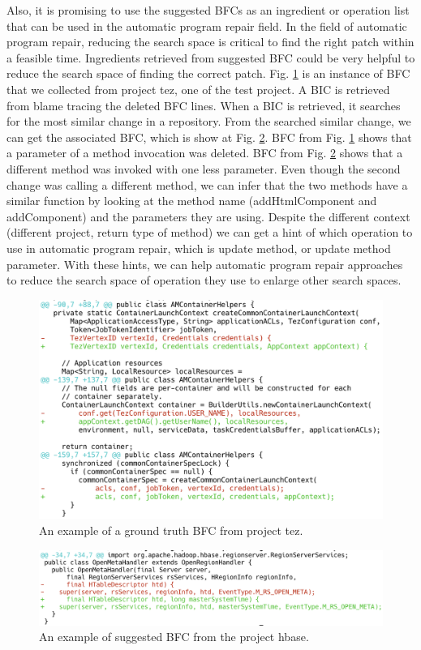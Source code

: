 Also, it is promising to use the suggested BFCs as an ingredient or operation list that can be used in the automatic program repair field.
In the field of automatic program repair, reducing the search space is critical to find the right patch within a feasible time.
Ingredients retrieved from suggested BFC could be very helpful to reduce the search space of finding the correct patch.
Fig. \ref{fig:ps_1} is an instance of BFC that we collected from project tez, one of the test project. 
A BIC is retrieved from blame tracing the deleted BFC lines.
When a BIC is retrieved, it searches for the most similar change in a repository.
From the searched similar change, we can get the associated BFC, which is show at Fig. \ref{fig:ps_2}.
BFC from Fig. \ref{fig:ps_1} shows that a parameter of a method invocation was deleted.
BFC from Fig. \ref{fig:ps_2} shows that a different method was invoked with one less parameter.
Even though the second change was calling a different method, we can infer that the two methods have a similar function by looking at the method name (addHtmlComponent and addComponent) and the parameters they are using.
Despite the different context (different project, return type of method) we can get a hint of which operation to use in automatic program repair, which is update method, or update method parameter.
With these hints, we can help automatic program repair approaches to reduce the search space of operation they use to enlarge other search spaces.


\begin{figure}[!tbp]
\renewcommand{\arraystretch}{1}
    \centering
    \includegraphics[width=\linewidth]{figures/ps1.png}\hfill
    \caption{An example of a ground truth BFC from project tez.}
    \label{fig:ps_1}
\end{figure}

\begin{figure}[!tbp]
\renewcommand{\arraystretch}{1}
    \centering
    \includegraphics[width=\linewidth]{figures/ps2.png}\hfill
    \caption{An example of suggested BFC from the project hbase.}
    \label{fig:ps_2}
\end{figure}